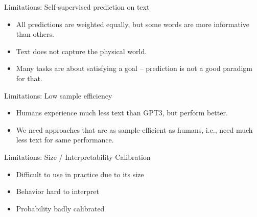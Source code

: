 
\begin{frame}{Limitations: Self-supervised prediction on text}

\vfill

  \begin{itemize}
\item All predictions are weighted equally, but some
words are more informative than others.
    \item Text does not capture the physical world.
\item Many tasks are about satisfying a goal --
prediction is not a good paradigm for that.
    \end{itemize}

\vfill

\end{frame}


\begin{frame}{Limitations: Low sample efficiency}

\vfill

  \begin{itemize}
    \item Humans experience much less text than GPT3, but
perform better.
    \item We  need approaches that are as
    sample-efficient as humans, i.e., need much less text
    for same performance.

    \end{itemize}

\vfill

\end{frame}


\begin{frame}{Limitations: Size / Interpretability Calibration}

\vfill

  \begin{itemize}
\item Difficult to use in practice due to its size
    \item Behavior hard to interpret
    \item Probability badly calibrated
    \end{itemize}

\vfill

\end{frame}


